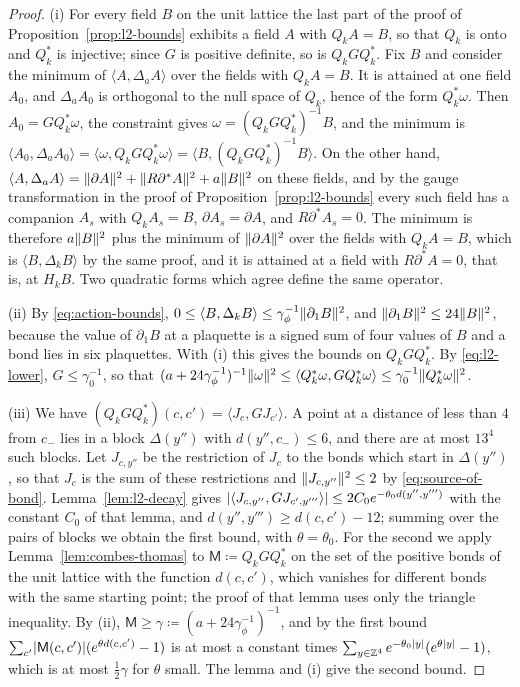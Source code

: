 \documentclass[11pt]{preprint}
\DeclarePairedDelimiter{\abs}{\lvert}{\rvert}
\DeclarePairedDelimiter{\norm}{\lVert}{\rVert}
\numberwithin{equation}{section}
\theoremstyle{definition}
\theoremstyle{remark}
\theoremstyle{plain}
\begin{document}
\begin{proof}
(i) For every field $B$ on the unit lattice the last part of the proof of Proposition~\ref{prop:l2-bounds} exhibits a field $A$ with $Q_kA = B$, so that $Q_k$ is onto and $Q_k^*$ is injective; since $G$ is positive definite, so is $Q_kGQ_k^*$. Fix $B$ and consider the minimum of $\langle A, \Delta_aA\rangle$ over the fields with $Q_kA = B$. It is attained at one field $A_0$, and $\Delta_aA_0$ is orthogonal to the null space of $Q_k$, hence of the form $Q_k^*\omega$. Then $A_0 = GQ_k^*\omega$, the constraint gives $\omega = (Q_kGQ_k^*)^{-1}B$, and the minimum is $\langle A_0, \Delta_aA_0\rangle = \langle\omega, Q_kGQ_k^*\omega\rangle = \langle B, (Q_kGQ_k^*)^{-1}B\rangle$. On the other hand, $\langle A, \Delta_aA\rangle = \norm{\partial A}^2 + \norm{R\partial^*A}^2 + a\norm{B}^2$ on these fields, and by the gauge transformation in the proof of Proposition~\ref{prop:l2-bounds} every such field has a companion $A_s$ with $Q_kA_s = B$, $\partial A_s = \partial A$, and $R\partial^*A_s = 0$. The minimum is therefore $a\norm{B}^2$ plus the minimum of $\norm{\partial A}^2$ over the fields with $Q_kA = B$, which is $\langle B, \Delta_kB\rangle$ by the same proof, and it is attained at a field with $R\partial^*A = 0$, that is, at $H_kB$. Two quadratic forms which agree define the same operator.

(ii) By \eqref{eq:action-bounds}, $0 \leq \langle B, \Delta_kB\rangle \leq \gamma_\phi^{-1}\norm{\partial_1B}^2$, and $\norm{\partial_1B}^2 \leq 24\norm{B}^2$, because the value of $\partial_1B$ at a plaquette is a signed sum of four values of $B$ and a bond lies in six plaquettes. With (i) this gives the bounds on $Q_kGQ_k^*$. By \eqref{eq:l2-lower}, $G \leq \gamma_0^{-1}$, so that $(a + 24\gamma_\phi^{-1})^{-1}\norm\omega^2 \leq \langle Q_k^*\omega, GQ_k^*\omega\rangle \leq \gamma_0^{-1}\norm{Q_k^*\omega}^2$.

(iii) We have $(Q_kGQ_k^*)(c, c') = \langle J_c, GJ_{c'}\rangle$. A point at a distance of less than $4$ from $c_-$ lies in a block $\Delta(y'')$ with $d(y'', c_-) \leq 6$, and there are at most $13^4$ such blocks. Let $J_{c,y''}$ be the restriction of $J_c$ to the bonds which start in $\Delta(y'')$, so that $J_c$ is the sum of these restrictions and $\norm{J_{c,y''}}^2 \leq 2$ by \eqref{eq:source-of-bond}. Lemma~\ref{lem:l2-decay} gives $\abs{\langle J_{c,y''}, GJ_{c',y'''}\rangle} \leq 2C_0e^{-\theta_0d(y'', y''')}$ with the constant $C_0$ of that lemma, and $d(y'', y''') \geq d(c, c') - 12$; summing over the pairs of blocks we obtain the first bound, with $\theta = \theta_0$. For the second we apply Lemma~\ref{lem:combes-thomas} to $\mathsf M \coloneqq Q_kGQ_k^*$ on the set of the positive bonds of the unit lattice with the function $d(c, c')$, which vanishes for different bonds with the same starting point; the proof of that lemma uses only the triangle inequality. By (ii), $\mathsf M \geq \gamma \coloneqq (a + 24\gamma_\phi^{-1})^{-1}$, and by the first bound $\sum_{c'}\abs{\mathsf M(c, c')}(e^{\theta d(c, c')} - 1)$ is at most a constant times $\sum_{y \in \mathbb Z^4}e^{-\theta_0\abs y}(e^{\theta\abs y} - 1)$, which is at most $\frac12\gamma$ for $\theta$ small. The lemma and (i) give the second bound.
\end{proof}
\end{document}
